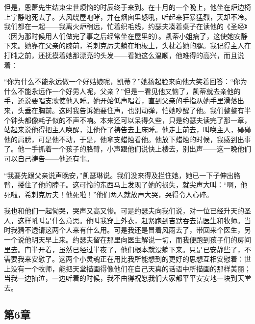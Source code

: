 \par 但是，恩萧先生结束尘世烦恼的时辰终于来到。在十月的一个晚上，他坐在炉边椅上宁静地死去了。大风绕屋咆哮，并在烟囱里怒吼，听起来狂暴猛烈，天却不冷。我们都在一起——我离火炉稍远，忙着织毛线，约瑟夫凑着桌子在读他的《圣经》（因为那时候用人们做完了事之后经常坐在屋里的）。凯蒂小姐病了，这使她安静下来。她靠在父亲的膝前，希刺克厉夫躺在地板上，头枕着她的腿。我记得主人在打盹之前，还抚摸着她那漂亮的头发——看她这么温顺，他难得的高兴，而且说着：
\par “你为什么不能永远做一个好姑娘呢，凯蒂？”她扬起脸来向他大笑着回答：“你为什么不能永远作一个好男人呢，父亲？”但是一看见他又恼了，凯蒂就去亲他的手，还说要唱支歌使他入睡。她开始低声唱着，直到父亲的手指从她手里滑落出来，头垂在胸前。这时我告诉她要住声，也别动弹，怕她吵醒了他。我们整整有半个钟头都像耗子似的不声不响。本来还可以呆得久些，只是约瑟夫读完了那一章，站起来说他得把主人唤醒，让他作了祷告去上床睡。他走上前去，叫唤主人，碰碰他的肩膀，可是他不动，于是，他拿支蜡烛看他。他放下蜡烛的时候，我感到出事了。他一手抓着一个孩子的胳臂，小声跟他们说快上楼去，别出声——这一晚他们可以自己祷告——他还有事。
\par “我要先跟父亲说声晚安，”凯瑟琳说。我们没来得及拦住她，她已一下子伸出胳臂，搂住了他的脖子。这可怜的东西马上发现了她的损失，就尖声大叫：“啊，他死啦，希刺克厉夫！他死啦！”他们两人就放声大哭，哭得令人心碎。
\par 我也和他们一起恸哭，哭声又高又惨。可是约瑟夫向我们说，对一位已经升天的圣人，这样吼叫是什么意思。他叫我穿上外衣，赶紧跑到吉默吞去请医生和牧师。当时我猜不透请这两个人来有什么用。可是我还是冒着风雨去了，带回来个医生，另一个说他明天早上来。约瑟夫留在那里向医生解说一切，而我便跑到孩子们的房间里去。门半开着，虽然已经过半夜了，他们根本就没躺下来。只是已安静些了，不需要我来安慰了。这两个小灵魂正在用比我所能想到的更好的思想互相安慰着：世上没有一个牧师，能把天堂描画得像他们在自己天真的话语中所描画的那样美丽；当我一边抽泣，一边听着的时候，我不由得祝愿我们大家都平平安安地一块到天堂去。


\subsection{第6章}

